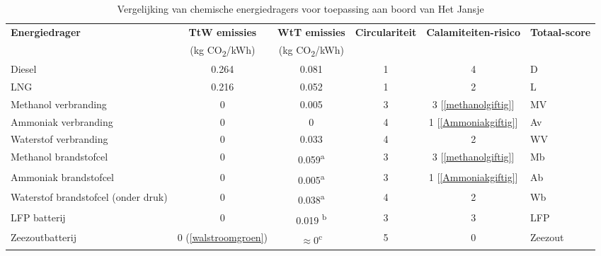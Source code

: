 \begin{table}[h]
\centering
\caption{Vergelijking van chemische energiedragers voor toepassing aan boord van Het Jansje}
\label{tab:chemische_energiedragers}
\renewcommand{\arraystretch}{1.3}
\footnotesize
\begin{tabular}{lcccc>{\centering\arraybackslash}p{1.6cm}}
\hline
\textbf{Energiedrager} &
\textbf{TtW emissies} &
\textbf{WtT emissies} &
\textbf{Circulariteit} &
\textbf{Calamiteiten-risico} &
\textbf{Totaal-score} \\
& \scriptsize(kg CO\textsubscript{2}/kWh) & \scriptsize(kg CO\textsubscript{2}/kWh) & & & \\
\hline
Diesel
  & 0.264 \cite{CO2Emissiefactoren2026}
  & 0.081 \cite{CO2Emissiefactoren2026}
  & 1 \cite{EIADieselExplained2024}
  & 4 \cite{PoisonControlGasolineDiesel}
  & D \\
LNG
  & 0.216 \cite{CO2Emissiefactoren2026}
  & 0.052 \cite{CO2Emissiefactoren2026}
  & 1 \cite{GHDEnergyLNG}
  & 2 \cite{CLNGSafety}
  & L \\
Methanol verbranding
  & 0
  & 0.005 \cite{CO2Emissiefactoren2026}
  & 3 \cite{KlineMethanol2024}
  & 3 [\ref{methanolgiftig}]
  & MV \\
Ammoniak verbranding
  & 0 \cite{IEAAMFAmmoniaEmissions}
  & 0 \cite{IEAAMFAmmoniaEmissions}
  & 4 \cite{IEAAMFAmmoniaEmissions}
  & 1 [\ref{Ammoniakgiftig}]
  & Av \\
Waterstof verbranding
  & 0 \cite{CO2Emissiefactoren2026}
  & 0.033
  & 4 \cite{DOEHydrogenStorage}
  & 2 \cite{UCSSafetyHydrogen}
  & WV \\
Methanol brandstofcel
  & 0 \cite{CO2Emissiefactoren2026}
  & 0.059\textsuperscript{a} \cite{Elsevier}
  & 3 \cite{KlineMethanol2024}
  & 3 [\ref{methanolgiftig}]
  & Mb \\
Ammoniak brandstofcel
  & 0 \cite{CO2Emissiefactoren2026}
  & 0.005\textsuperscript{a} \cite{Elsevier}
  & 3 \cite{IEAAMFAmmoniaEmissions}
  & 1 [\ref{Ammoniakgiftig}]
  & Ab \\
Waterstof brandstofcel (onder druk)
  & 0 \cite{CO2Emissiefactoren2026}
  & 0.038\textsuperscript{a} \cite{IEAAMFAmmoniaEmissions}
  & 4 \cite{DOEHydrogenStorage}
  & 2 \cite{UCSSafetyHydrogen}
  & Wb \\
LFP batterij
  & 0 \cite{GenCellFOXProduct}
  & 0.019 \textsuperscript{b} \cite{GjetaLCA2024}
  & 3 \cite{Bazzanini2024}
  & 3 \cite{DTGPowerLFPFire}
  & LFP \\
Zeezoutbatterij
  & 0 (\ref{walstroomgroen})
  & $\approx$0\textsuperscript{c} \cite{GjetaLCA2024}
  & 5 \cite{drten_zeezout_batterij2}
  & 0 \cite{drten_zeezout_batterij2}
  & Zeezout \\
\hline
\end{tabular}


\end{table}
